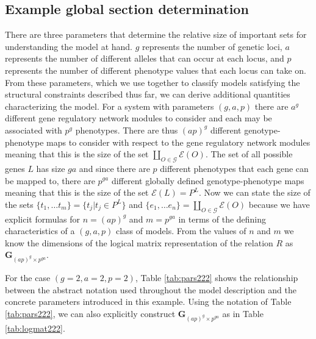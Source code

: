\documentclass[10pt]{article}
\begin{document}
\subsection*{Example global section determination}
There are three parameters that determine the relative size of important sets for understanding the model at hand. $g$ represents the number of genetic loci, $a$ represents the number of different alleles that can occur at each locus, and $p$ represents the number of different phenotype values that each locus can take on. From these parameters, which we use together to classify models satisfying the structural constraints described thus far, we can derive additional quantities characterizing the model. For a system with parameters $(g,a,p)$ there are $a^g$ different gene regulatory network modules to consider and each may be associated with $p^g$ phenotypes. There are thus $(ap)^g$ different genotype-phenotype maps to consider with respect to the gene regulatory network modules meaning that this is the size of the set $\coprod_{O \in \mathcal{G}} \mathcal{E}(O)$. The set of all possible genes $L$ has size $ga$ and since there are $p$ different phenotypes that each gene can be mapped to, there are $p^{ga}$ different globally defined genotype-phenotype maps meaning that this is the size of the set $\mathcal{E}(L) = P^L$. Now we can state the size of the sets $\{t_1, \ldots t_m\} = \{t_j | t_j \in P^L\}$ and $\{e_1, \ldots e_n\} = \coprod_{O \in \mathcal{G}} \mathcal{E}(O)$ because we have explicit formulas for $n = (ap)^g$ and $m = p^{ga}$ in terms of the defining characteristics of a $(g,a,p)$ class of models. From the values of $n$ and $m$ we know the dimensions of the logical matrix representation of the relation $R$ as $\mathbf{G}_{(ap)^g \times p^{ga}}$.

For the case $(g=2,a=2,p=2)$, Table \ref{tab:pars222} shows the relationship between the abstract notation used throughout the model description and the concrete parameters introduced in this example. Using the notation of Table \ref{tab:pars222}, we can also explicitly construct $\mathbf{G}_{(ap)^g \times p^{ga}}$ as in Table \ref{tab:logmat222}.
\end{document}
